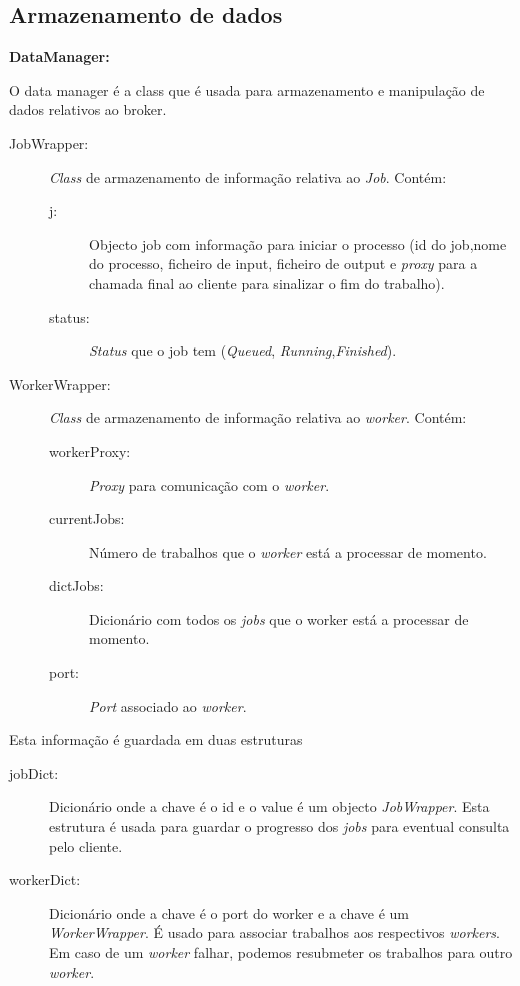 \documentclass[a4paper]{article}
\begin{document}
\subsection{Armazenamento de dados}
\textbf{DataManager:}

O data manager é a class que é usada para armazenamento e manipulação de dados relativos ao broker.

\begin{description}
	\item[JobWrapper:]\hfill
	
	\emph{Class} de armazenamento de informação relativa ao \emph{Job}. Contém:
		\begin{description}
					\item[j:]
					Objecto job com informação para iniciar o processo (id do job,nome do processo, 		ficheiro de input, ficheiro de output e \emph{proxy} para a chamada final ao cliente para sinalizar o fim do trabalho).
					\item[status:]
					\emph{Status} que o job tem (\emph{Queued}, \emph{Running},\emph{Finished}).
			\end{description}
	
	\item[WorkerWrapper:]\hfill
	
	\emph{Class} de armazenamento de informação relativa ao \emph{worker}. Contém:
		\begin{description}
			\item[workerProxy:] \emph{Proxy} para comunicação com o \emph{worker}.
			\item[currentJobs:] Número de trabalhos que o \emph{worker} está a processar de momento.
			\item[dictJobs:] Dicionário com todos os \emph{jobs} que o worker está a processar de momento.
			\item[port:]\emph{Port} associado ao \emph{worker}.
		\end{description}
			
\end{description}

\medskip	
Esta informação é guardada em duas estruturas
		\begin{description}
		\item[jobDict:] Dicionário onde a chave é o id e o value é um objecto \emph{JobWrapper}. Esta estrutura é usada para guardar o progresso dos \emph{jobs} para eventual consulta pelo cliente.
		\item[workerDict:] Dicionário onde a chave é o port do worker e a chave é um \emph{WorkerWrapper}. É usado para associar trabalhos aos respectivos \emph{workers}. Em caso de um \emph{worker} falhar, podemos resubmeter os trabalhos para outro \emph{worker}.

	\end{description}
\end{document}
